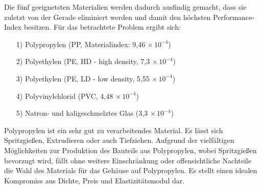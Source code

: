 Die fünf geeignetsten Materialien werden dadurch ausfindig gemacht, dass sie zuletzt von der Gerade eliminiert werden und damit den höchsten Performance-Index besitzen. Für das betrachtete Problem ergibt sich:
\begin{itemize}
\item[1)] Polypropylen (PP, Materialindex: 9,46$\,\times10^{-4}$)
\item[2)] Polyethylen (PE, HD - high density, 7,3$\,\times10^{-4}$)
\item[3)] Polyethylen (PE, LD - low density, 5,55$\,\times10^{-4}$)
\item[4)] Polyvinylchlorid (PVC, 4,48$\,\times10^{-4}$)
\item[5)] Natron- und kaligeschmelztes Glas (3,3$\,\times10^{-4}$)
\end{itemize}
Polypropylen ist ein sehr gut zu verarbeitendes Material. Es lässt sich Spritzgießen, Extrudieren oder auch Tiefziehen. Aufgrund der vielfältigen Möglichkeiten zur Produktion des Bauteils aus Polypropylen, wobei Spritzgießen bevorzugt wird, fällt ohne weitere Einschränkung oder offensichtliche Nachteile die Wahl des Materials für das Gehäuse auf Polypropylen. Es stellt einen idealen Kompromiss aus Dichte, Preis und Elastizitätsmodul dar.

